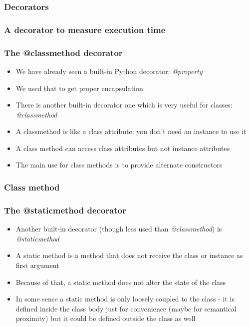 \documentclass[9pt]{beamer}
\begin{document}
\begin{frame}
  \frametitle{Decorators}
  
\end{frame}


\begin{frame}
  \frametitle{A decorator to measure execution time}
  
\end{frame}


\begin{frame}
  \frametitle{The @classmethod decorator}
  \begin{itemize}
    \item We have already seen a built-in Python decorator: \emph{@property}
    \item We used that to get proper encapsulation
    \item There is another built-in decorator one which is very useful for classes: \alert{\emph{@classmethod}}
    \item A classmethod is like a class attribute: you don't need an instance to
          use it
    \item A class method can access class attributes but not instance attributes
    \item The main use for class methods is to provide \alert{alternate constructors}
  \end{itemize}
\end{frame}


\begin{frame}
  \frametitle{Class method}
  
\end{frame}


\begin{frame}
  \frametitle{The @staticmethod decorator}
  \begin{itemize}
    \item Another built-in decorator (though less used than \emph{@classmethod})
          is \alert{\emph{@staticmethod}}
    \smallskip
    \item A static method is a method that does not receive the class or instance
          as first argument
    \smallskip
    \item Because of that, a static method does not alter the state of the class
    \smallskip
    \item In some sense a static method is only loosely coupled to the class - 
          it is defined inside the class body just for convenience (maybe for
          semantical proximity) but it could be defined outside the class as well
  \end{itemize}
\end{frame}
\end{document}
